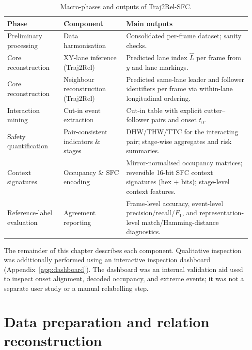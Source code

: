 \documentclass[12pt,a4paper,twoside,openright]{report}
\newcommand{\FrameworkName}{Traj2Rel-SFC}
\begin{document}
    \begin{table}[H]
        \centering
        \caption{Macro-phases and outputs of \FrameworkName{}.}
        \label{tab:framework-phases}
        {\small
        \setlength{\tabcolsep}{4pt}
            \begin{tabularx}{\textwidth}{@{}l l >{\raggedright\arraybackslash}X@{}}
\toprule
Phase & Component & Main outputs \\
\midrule
Preliminary processing & Data harmonisation & Consolidated per-frame dataset; sanity checks. \\
\midrule
Core reconstruction & XY-lane inference (Traj2Rel) & Predicted lane index $\hat{L}$ per frame from $y$ and lane markings. \\
Core reconstruction & Neighbour reconstruction (Traj2Rel) & Predicted same-lane leader and follower identifiers per frame via within-lane longitudinal ordering. \\
\midrule
Interaction mining & Cut-in event extraction & Cut-in table with explicit cutter--follower pairs and onset $t_0$. \\
Safety quantification & Pair-consistent indicators \& stages & DHW/THW/TTC for the interacting pair; stage-wise aggregates and risk summaries. \\
\midrule
Context signatures & Occupancy \& SFC encoding & Mirror-normalised occupancy matrices; reversible 16-bit SFC context signatures (hex + bits); stage-level context features. \\
\midrule
Reference-label evaluation & Agreement reporting & Frame-level accuracy, event-level precision/recall/$F_1$, and representation-level match/Hamming-distance diagnostics. \\
\bottomrule
            \end{tabularx}}
    \end{table}

    The remainder of this chapter describes each component. Qualitative inspection was additionally performed using an interactive inspection dashboard (Appendix~\ref{app:dashboard}). The dashboard was an internal validation aid used to inspect onset alignment, decoded occupancy, and extreme events; it was not a separate user study or a manual relabelling step.

    \section{Data preparation and relation reconstruction}
\end{document}
